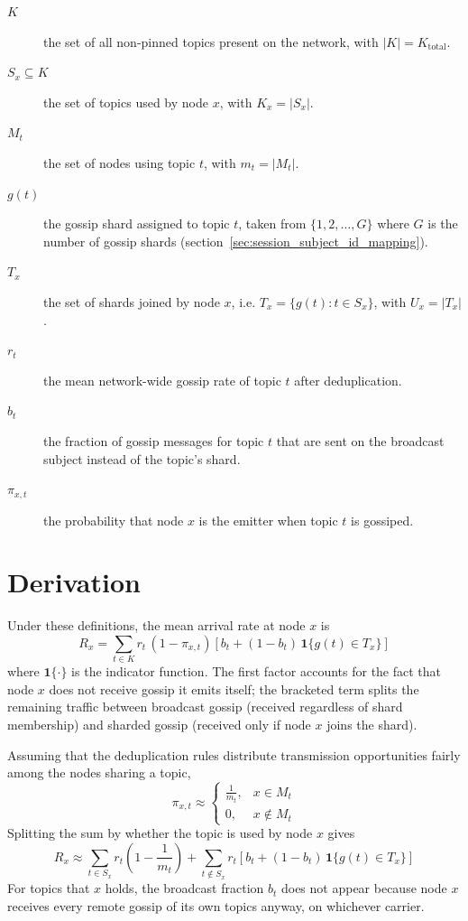 \begin{description}
    \item[$K$] the set of all non-pinned topics present on the network, with
    $|K| = K_{\text{total}}$.
    \item[$S_x \subseteq K$] the set of topics used by node $x$, with
    $K_x = |S_x|$.
    \item[$M_t$] the set of nodes using topic $t$, with $m_t = |M_t|$.
    \item[$g(t)$] the gossip shard assigned to topic $t$, taken from
    $\{1, 2, \ldots, G\}$ where $G$ is the number of gossip shards
    (section~\ref{sec:session_subject_id_mapping}).
    \item[$T_x$] the set of shards joined by node $x$, i.e.
    $T_x = \{g(t) : t \in S_x\}$, with $U_x = |T_x|$.
    \item[$r_t$] the mean network-wide gossip rate of topic $t$ after
    deduplication.
    \item[$b_t$] the fraction of gossip messages for topic $t$ that are sent
    on the broadcast subject instead of the topic's shard.
    \item[$\pi_{x,t}$] the probability that node $x$ is the emitter when
    topic $t$ is gossiped.
\end{description}

\section{Derivation}

Under these definitions, the mean arrival rate at node $x$ is
\begin{equation*}
    R_x = \sum_{t \in K} r_t\,(1 - \pi_{x,t})
          \left[ b_t + (1 - b_t)\,\mathbf{1}\{g(t) \in T_x\} \right]
\end{equation*}
where $\mathbf{1}\{\cdot\}$ is the indicator function. The first factor
accounts for the fact that node $x$ does not receive gossip it emits itself;
the bracketed term splits the remaining traffic between broadcast gossip
(received regardless of shard membership) and sharded gossip (received only
if node $x$ joins the shard).

Assuming that the deduplication rules distribute transmission opportunities
fairly among the nodes sharing a topic,
\begin{equation*}
    \pi_{x,t} \approx
    \begin{cases}
        \frac{1}{m_t}, & x \in M_t \\
        0,             & x \notin M_t
    \end{cases}
\end{equation*}
Splitting the sum by whether the topic is used by node $x$ gives
\begin{equation*}
    R_x \approx
    \sum_{t \in S_x} r_t \left(1 - \frac{1}{m_t}\right)
    + \sum_{t \notin S_x} r_t
      \left[ b_t + (1 - b_t)\,\mathbf{1}\{g(t) \in T_x\} \right]
\end{equation*}
For topics that $x$ holds, the broadcast fraction $b_t$ does not appear
because node $x$ receives every remote gossip of its own topics anyway, on
whichever carrier.

